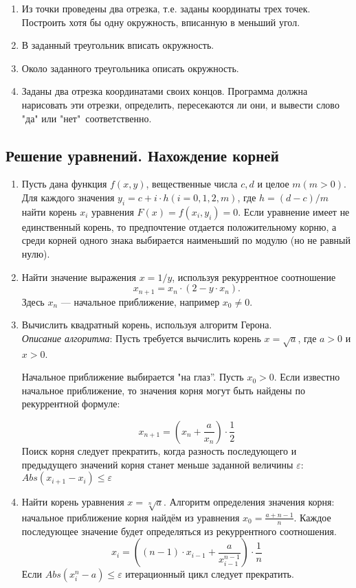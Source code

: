 \begin{enumerate}
  \item Из точки проведены два отрезка, т.е. заданы координаты трех точек. Построить хотя бы одну окружность, вписанную в меньший угол.

  \item В заданный треугольник вписать окружность.

  \item Около заданного треугольника описать окружность.

  \item Заданы два отрезка координатами своих концов. Программа должна нарисовать эти отрезки, определить, пересекаются ли они, и вывести слово "да" \: или "нет"\ соответственно. 

\end{enumerate}


\subsection{Решение уравнений. Нахождение корней}

\begin{enumerate}

  \item Пусть дана функция $f(x,y)$, вещественные числа $c, d$ и целое $m (m>0)$. Для каждого значения $y_i = c + i\cdot h (i= 0,1,2, m)$, где $h = (d-c)/m$ 
найти корень $x_i$ уравнения $F(x) = f(x_i, y_i) = 0$. Если уравнение имеет не единственный корень, то предпочтение отдается положительному корню, 
а среди корней одного знака выбирается наименьший по модулю (но не равный нулю).

  \item Найти значение выражения $x = 1/y$, используя рекуррентное соотношение 
$$x_{n+1} = x_n\cdot (2 - y\cdot x_n).$$ 
Здесь $x_n$ --- начальное приближение, например $x_0\neq 0$.

  \item Вычислить квадратный корень, используя алгоритм Герона.\\ {\it Описание алгоритма}: Пусть требуется вычислить корень $x = \sqrt{a}$, где $a>0$ и $x>0$.
 
Начальное   приближение выбирается "на глаз”. Пусть  $x_0 > 0$. Если известно начальное приближение, то значения корня могут быть найдены по рекуррентной формуле:

$$x_{n+1} = \left(x_n + \frac{a}{x_n}\right)\cdot\frac{1}{2}$$
Поиск корня следует прекратить, когда разность последующего и предыдущего значений корня станет меньше заданной величины $\varepsilon$:
$Abs(x_{i+1}-x_i)\leq\varepsilon$

  \item Найти корень уравнения $x = \sqrt[n]{a}$. Алгоритм опреде­ления значения корня: начальное приближение корня  найдём из уравнения    $x_0 = \frac{a + n -1}{n} $.  Каждое последующее значение будет определяться из рекуррентного соотношения. 
$$x_i = \left((n-1)\cdot x_{i-1} + \frac{a}{x^{n-1}_{i-1}}   \right)\cdot\frac{1}{n}$$
Если $Abs(x^n_{i}-a)\leq\varepsilon$ итерационный цикл следует прекратить. 

\end{enumerate}


